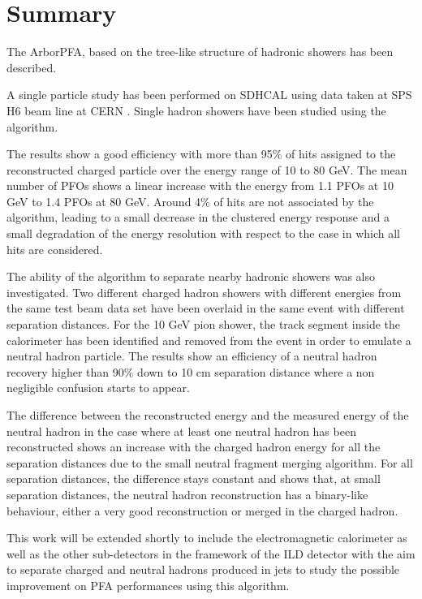 \documentclass[12pt]{article}
\begin{document}
\section{Summary}

The ArborPFA, based on the tree-like structure of hadronic showers has been described. 

A single particle study has been performed on SDHCAL using data taken at SPS H6 beam line at CERN \cite{sdhcal-paper}. Single hadron showers have been studied using the algorithm.

The results show a good efficiency with more than 95\% of hits assigned to the reconstructed charged particle over the energy range of 10 to 80 GeV. The mean number of PFOs shows a linear increase with the energy from 1.1 PFOs at 10 GeV to 1.4 PFOs at 80 GeV. Around 4\% of hits are not associated by the algorithm, leading to a small decrease in the clustered energy response and a small degradation of the energy resolution with respect to the case in which all hits are considered.

The ability of the algorithm to separate nearby hadronic showers was also investigated. Two different charged hadron showers with different energies from the same test beam data set have been overlaid in the same event with different separation distances. For the 10 GeV pion shower, the track segment inside the calorimeter has been identified and removed from the event in order to emulate a neutral hadron particle. The results show an efficiency of a neutral hadron recovery higher than 90\% down to 10 cm separation distance where a non negligible confusion starts to appear. 

The difference between the reconstructed energy and the measured energy of the neutral hadron in the case where at least one neutral hadron has been reconstructed shows an increase with the charged hadron energy for all the separation distances due to the small neutral fragment merging algorithm. For all separation distances, the difference stays constant and shows that, at small separation distances, the neutral hadron reconstruction has a binary-like behaviour, either a very good reconstruction or merged in the charged hadron.

This work will be extended shortly to include the electromagnetic calorimeter as well as the other sub-detectors in the framework of the ILD detector with the aim to separate charged and neutral hadrons produced in jets to study the possible improvement on PFA performances using this algorithm.
\end{document}
